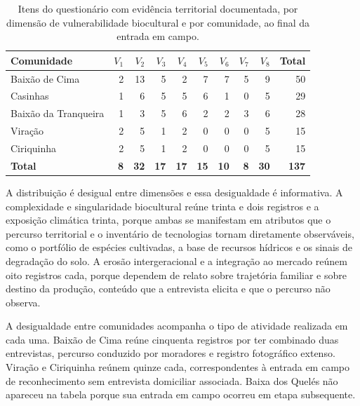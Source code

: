 \documentclass[pdflatex,sn-basic]{sn-jnl}%
\theoremstyle{thmstyleone}%
\theoremstyle{thmstyletwo}%
\theoremstyle{thmstylethree}%
\begin{document}
\begin{table}[H]
\centering
\caption{Itens do questionário com evidência territorial documentada, por dimensão de vulnerabilidade biocultural e por comunidade, ao final da entrada em campo.}
\label{tab:cobertura_isb}
\small
\setlength{\tabcolsep}{5pt}
\begin{tabular}{lrrrrrrrrr}
\toprule
\textbf{Comunidade} & $V_1$ & $V_2$ & $V_3$ & $V_4$ & $V_5$ & $V_6$ & $V_7$ & $V_8$ & \textbf{Total} \\
\midrule
Baixão de Cima        & 2 & 13 & 5 & 2 & 7 & 7 & 5 & 9 & 50 \\
Casinhas              & 1 &  6 & 5 & 5 & 6 & 1 & 0 & 5 & 29 \\
Baixão da Tranqueira  & 1 &  3 & 5 & 6 & 2 & 2 & 3 & 6 & 28 \\
Viração               & 2 &  5 & 1 & 2 & 0 & 0 & 0 & 5 & 15 \\
Ciriquinha            & 2 &  5 & 1 & 2 & 0 & 0 & 0 & 5 & 15 \\
\midrule
\textbf{Total}        & \textbf{8} & \textbf{32} & \textbf{17} & \textbf{17} & \textbf{15} & \textbf{10} & \textbf{8} & \textbf{30} & \textbf{137} \\
\bottomrule
\end{tabular}
\end{table}

A distribuição é desigual entre dimensões e essa desigualdade é informativa. A complexidade e singularidade biocultural reúne trinta e dois registros e a exposição climática trinta, porque ambas se manifestam em atributos que o percurso territorial e o inventário de tecnologias tornam diretamente observáveis, como o portfólio de espécies cultivadas, a base de recursos hídricos e os sinais de degradação do solo. A erosão intergeracional e a integração ao mercado reúnem oito registros cada, porque dependem de relato sobre trajetória familiar e sobre destino da produção, conteúdo que a entrevista elicita e que o percurso não observa.

A desigualdade entre comunidades acompanha o tipo de atividade realizada em cada uma. Baixão de Cima reúne cinquenta registros por ter combinado duas entrevistas, percurso conduzido por moradores e registro fotográfico extenso. Viração e Ciriquinha reúnem quinze cada, correspondentes à entrada em campo de reconhecimento sem entrevista domiciliar associada. Baixa dos Quelés não apareceu na tabela porque sua entrada em campo ocorreu em etapa subsequente.
\end{document}
